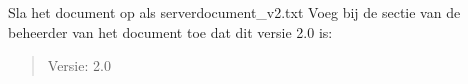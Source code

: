 Sla het document op als serverdocument\_v2.txt
Voeg bij de sectie van de beheerder van het document toe dat dit versie 2.0 is:
\begin{quote}
Versie: 2.0
\end{quote}

